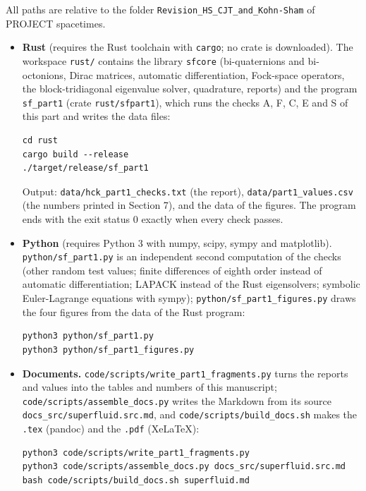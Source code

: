 \documentclass[
  10pt,
]{article}
\begin{document}
All paths are relative to the folder
\texttt{Revision\_HS\_CJT\_and\_Kohn-Sham} of PROJECT spacetimes.

\begin{itemize}
\item
  \textbf{Rust} (requires the Rust toolchain with \texttt{cargo}; no
  crate is downloaded). The workspace \texttt{rust/} contains the
  library \texttt{sfcore} (bi-quaternions and bi-octonions, Dirac
  matrices, automatic differentiation, Fock-space operators, the
  block-tridiagonal eigenvalue solver, quadrature, reports) and the
  program \texttt{sf\_part1} (crate \texttt{rust/sfpart1}), which runs
  the checks A, F, C, E and S of this part and writes the data files:

\begin{verbatim}
cd rust
cargo build --release
./target/release/sf_part1
\end{verbatim}

  Output: \texttt{data/hck\_part1\_checks.txt} (the report),
  \texttt{data/part1\_values.csv} (the numbers printed in Section 7),
  and the data of the figures. The program ends with the exit status 0
  exactly when every check passes.
\item
  \textbf{Python} (requires Python 3 with numpy, scipy, sympy and
  matplotlib). \texttt{python/sf\_part1.py} is an independent second
  computation of the checks (other random test values; finite
  differences of eighth order instead of automatic differentiation;
  LAPACK instead of the Rust eigensolvers; symbolic Euler-Lagrange
  equations with sympy); \texttt{python/sf\_part1\_figures.py} draws the
  four figures from the data of the Rust program:

\begin{verbatim}
python3 python/sf_part1.py
python3 python/sf_part1_figures.py
\end{verbatim}
\item
  \textbf{Documents.} \texttt{code/scripts/write\_part1\_fragments.py}
  turns the reports and values into the tables and numbers of this
  manuscript; \texttt{code/scripts/assemble\_docs.py} writes the
  Markdown from its source \texttt{docs\_src/superfluid.src.md}, and
  \texttt{code/scripts/build\_docs.sh} makes the \texttt{.tex} (pandoc)
  and the \texttt{.pdf} (XeLaTeX):

\begin{verbatim}
python3 code/scripts/write_part1_fragments.py
python3 code/scripts/assemble_docs.py docs_src/superfluid.src.md
bash code/scripts/build_docs.sh superfluid.md
\end{verbatim}
\end{itemize}
\end{document}
